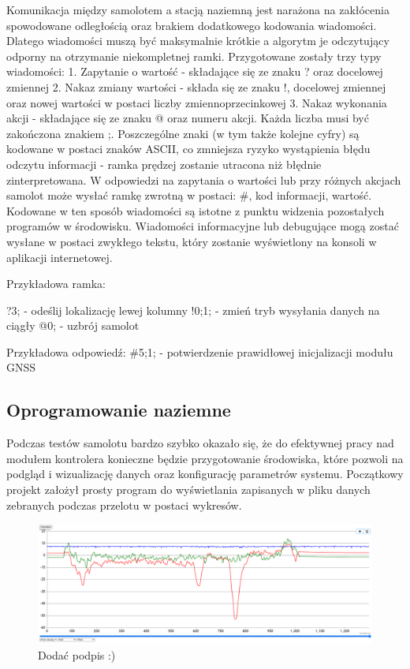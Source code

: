 \documentclass[12pt, a4paper]{article}
\begin{document}
Komunikacja między samolotem a stacją naziemną jest narażona na zakłócenia spowodowane odległością oraz brakiem dodatkowego kodowania wiadomości. Dlatego wiadomości muszą być maksymalnie krótkie a algorytm je odczytujący odporny na otrzymanie niekompletnej ramki. Przygotowane zostały trzy typy wiadomości:
1.	Zapytanie o wartość - składające się ze znaku ? oraz docelowej zmiennej
2.	Nakaz zmiany wartości - składa się ze znaku !, docelowej zmiennej oraz nowej wartości w postaci liczby zmiennoprzecinkowej
3.	Nakaz wykonania akcji - składające się ze znaku @ oraz numeru akcji.
Każda liczba musi być zakończona znakiem ;. Poszczególne znaki (w tym także kolejne cyfry) są kodowane w postaci znaków ASCII, co zmniejsza ryzyko wystąpienia błędu odczytu informacji - ramka prędzej zostanie utracona niż błędnie zinterpretowana. W odpowiedzi na zapytania o wartości lub przy różnych akcjach samolot może wysłać ramkę zwrotną w postaci: \#, kod informacji, wartość. Kodowane w ten sposób wiadomości są istotne z punktu widzenia pozostałych programów w środowisku. Wiadomości informacyjne lub debugujące mogą zostać wysłane w postaci zwykłego tekstu, który zostanie wyświetlony na konsoli w aplikacji internetowej. 

Przykładowa ramka: 

?3;  - odeślij lokalizację lewej kolumny
!0;1; - zmień tryb wysyłania danych na ciągły
@0; - uzbrój samolot

Przykładowa odpowiedź:
\#5;1; - potwierdzenie prawidłowej inicjalizacji modułu GNSS
\FloatBarrier
\subsection{Oprogramowanie naziemne}
Podczas testów samolotu bardzo szybko okazało się, że do efektywnej pracy nad modułem kontrolera konieczne będzie przygotowanie środowiska, które pozwoli na podgląd i wizualizację danych oraz konfigurację parametrów systemu. Początkowy projekt założył prosty program do wyświetlania zapisanych w pliku danych zebranych podczas przelotu w postaci wykresów.

 \begin{figure}[ht]
    \centering
    \includegraphics[width=1\textwidth]{starysystem}
    \caption{Dodać podpis :)}
\end{figure}
\end{document}
